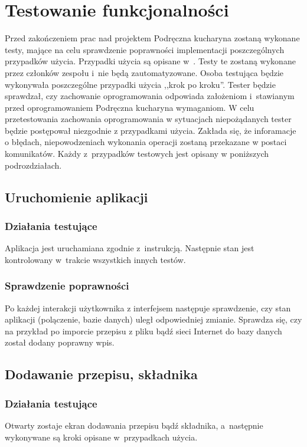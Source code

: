 \documentclass[12pt,leqno, twoside]{mwart}
\begin{document}
\section{Testowanie funkcjonalności}
\noindent Przed zakończeniem prac nad projektem Podręczna kucharyna zostaną wykonane testy, mające na celu sprawdzenie
poprawności implementacji poszczególnych przypadków użycia. Przypadki użycia są opisane w~\cite{APU}. Testy te zostaną wykonane
przez członków zespołu i~nie będą zautomatyzowane. Osoba testująca będzie wykonywała poszczególne przypadki użycia
,,krok po kroku''. Tester będzie sprawdzał, czy zachowanie oprogramowania odpowiada założeniom i~stawianym przed
oprogramowaniem Podręczna kucharyna wymaganiom. W celu przetestowania zachowania oprogramowania w sytuacjach
niepożądanych tester będzie postępował niezgodnie z przypadkami użycia. Zakłada się, że inforamacje o błędach,
niepowodzeniach wykonania operacji zostaną przekazane w postaci komunikatów. Każdy z~przypadków testowych jest opisany w
poniższych podrozdziałach.

\subsection{Uruchomienie aplikacji}
\subsubsection{Działania testujące}
\noindent Aplikacja jest uruchamiana zgodnie z~instrukcją. Następnie stan jest kontrolowany w~trakcie wszystkich innych testów.

\subsubsection{Sprawdzenie poprawności}
\noindent Po każdej interakcji użytkownika z interfejsem następuje sprawdzenie, czy stan aplikacji (polączenie, bazie
danych) uległ odpowiedniej zmianie. Sprawdza się, czy na przykład po imporcie przepisu z pliku bądź sieci Internet do
bazy danych został dodany poprawny wpis.

\subsection{Dodawanie przepisu, składnika}
\subsubsection{Działania testujące}
\noindent Otwarty zostaje ekran dodawania przepisu bądź składnika, a~następnie wykonywane są kroki opisane w~przypadkach
użycia.
\end{document}
